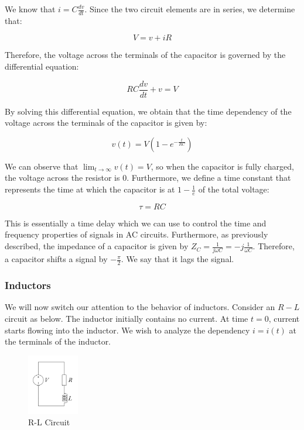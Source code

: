 \documentclass{article}
\begin{document}
We know that $i = C\frac{dv}{dt}$. Since the two circuit elements are in series, we determine that:

\[ V = v + iR \]

Therefore, the voltage across the terminals of the capacitor is governed by the differential equation:

\[ RC\frac{dv}{dt} + v = V \]

By solving this differential equation, we obtain that the time dependency of the voltage across the terminals of the capacitor is given by:

\[ v(t) = V\left(1 - e^{-\frac{t}{RC}}\right) \]

We can observe that $\lim_{t \to \infty} v(t) = V$, so when the capacitor is fully charged, the voltage across the resistor is $0$. Furthermore, we define a time constant that represents the time at which the capacitor is at $1 - \frac{1}{e}$ of the total voltage:

\[ \tau = RC \]

This is essentially a time delay which we can use to control the time and frequency properties of signals in AC circuits. Furthermore, as previously described, the impedance of a capacitor is given by $Z_C = \frac{1}{j\omega C} = -j \frac{1}{\omega C}$. Therefore, a capacitor shifts a signal by $- \frac{\pi}{2}$. We say that it lags the signal.

\subsubsection{Inductors}

We will now switch our attention to the behavior of inductors. Consider an $R-L$ circuit as below. The inductor initially contains no current. At time $t = 0$, current starts flowing into the inductor. We wish to analyze the dependency $i = i(t)$ at the terminals of the inductor.

\begin{figure}[h]
    \centering
    \includegraphics[width=0.2\textwidth]{images/rlcircuit.png}
    \caption{R-L Circuit}
    \label{fig:rl-circuit}
\end{figure}
\end{document}
